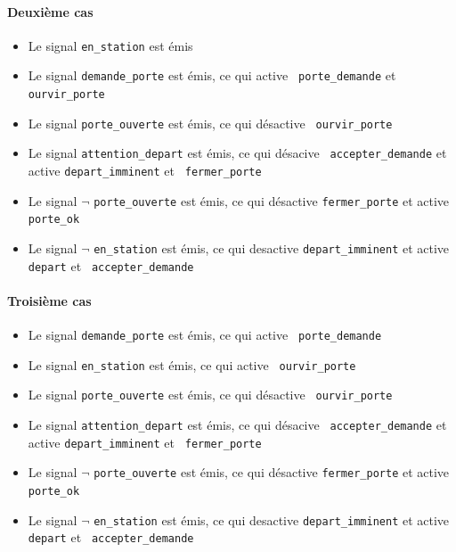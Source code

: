 \documentclass{article}
\begin{document}
      \paragraph{Deuxième cas}
        \begin{itemize}
          \item Le signal {\tt en\_station} est émis
          \item Le signal {\tt demande\_porte} est émis, ce qui active {\tt
            porte\_demande} et {\tt ourvir\_porte}
          \item Le signal {\tt porte\_ouverte} est émis, ce qui désactive {\tt
            ourvir\_porte} 
          \item Le signal {\tt attention\_depart} est émis, ce qui désacive {\tt
            accepter\_demande} et active {\tt depart\_imminent} et {\tt
            fermer\_porte}
          \item Le signal $\lnot$ {\tt porte\_ouverte} est émis, ce qui
            désactive {\tt fermer\_porte} et active {\tt porte\_ok}
          \item Le signal $\lnot$ {\tt en\_station} est émis, ce qui desactive
            {\tt depart\_imminent} et active {\tt depart} et {\tt
              accepter\_demande} 
        \end{itemize}

      \paragraph{Troisième cas}
        \begin{itemize}
          \item Le signal {\tt demande\_porte} est émis, ce qui active {\tt
            porte\_demande}
          \item Le signal {\tt en\_station} est émis, ce qui active {\tt
            ourvir\_porte}
          \item Le signal {\tt porte\_ouverte} est émis, ce qui désactive {\tt
            ourvir\_porte}
          \item Le signal {\tt attention\_depart} est émis, ce qui désacive {\tt
            accepter\_demande} et active {\tt depart\_imminent} et {\tt
            fermer\_porte}
          \item Le signal $\lnot$ {\tt porte\_ouverte} est émis, ce qui
            désactive {\tt fermer\_porte} et active {\tt porte\_ok}
          \item Le signal $\lnot$ {\tt en\_station} est émis, ce qui desactive
            {\tt depart\_imminent} et active {\tt depart} et {\tt
              accepter\_demande} 
        \end{itemize}
\end{document}
